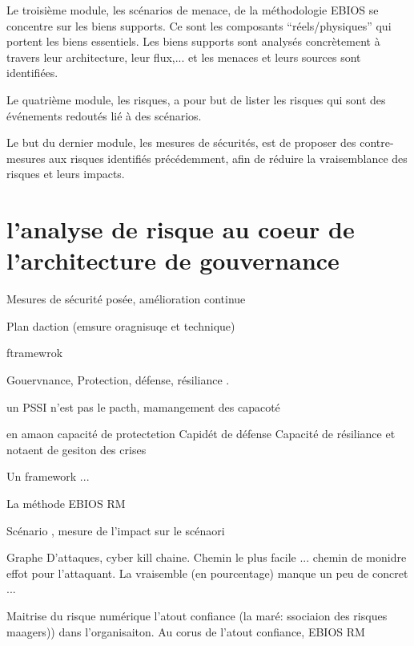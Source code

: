 Le troisième module, les scénarios de menace, de la méthodologie EBIOS se concentre sur les biens supports. Ce sont les composants “réels/physiques” qui portent les biens essentiels. Les biens supports sont analysés concrètement à travers leur architecture, leur flux,... et les menaces et leurs sources sont identifiées.

Le quatrième module, les risques, a pour but de lister les risques qui sont des événements redoutés lié à des scénarios.

Le but du dernier module, les mesures de sécurités, est de proposer des contre-mesures aux risques identifiés précédemment, afin de réduire la vraisemblance des risques et leurs impacts.

\section{l'analyse de risque au coeur de l'architecture de gouvernance}

Mesures de sécurité posée, amélioration continue

Plan daction (emsure oragnisuqe et technique)

ftramewrok

Gouervnance, Protection, défense, résiliance .

un PSSI n'est pas le pacth, mamangement des capacoté

en amaon
capacité de protectetion Capidét de défense
Capacité de résiliance et notaent de gesiton des crises

Un framework ...

La méthode EBIOS RM

Scénario , mesure de l'impact sur le scénaori

Graphe D'attaques, cyber kill chaine.
Chemin le plus facile ... chemin de monidre effot pour l'attaquant.
La vraisemble (en pourcentage) manque un peu de concret ...


Maitrise du risque numérique l'atout confiance (la maré: ssociaion des risques maagers)) dans l'organisaiton.  Au corus de l'atout confiance, EBIOS RM

